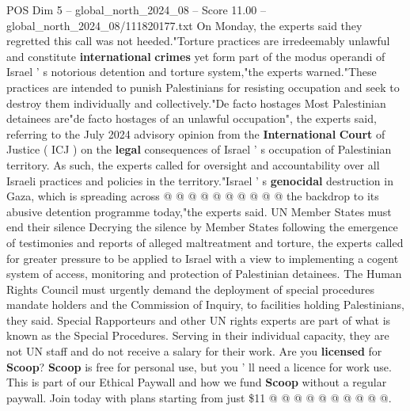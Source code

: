 \begin{textsample}{POS Dim 5 – global\_north\_2024\_08 – Score 11.00 – global\_north\_2024\_08/111820177.txt}
On Monday, the experts said they regretted this call was not heeded."Torture practices are irredeemably unlawful and constitute \textbf{international} \textbf{crimes} yet form part of the modus operandi of Israel ' s notorious detention and torture system,"the experts warned."These practices are intended to punish Palestinians for resisting occupation and seek to destroy them individually and collectively."De facto hostages Most Palestinian detainees are"de facto hostages of an unlawful occupation", the experts said, referring to the July 2024 advisory opinion from the \textbf{International} \textbf{Court} of Justice ( ICJ ) on the \textbf{legal} consequences of Israel ' s occupation of Palestinian territory.
As such, the experts called for oversight and accountability over all Israeli practices and policies in the territory."Israel ' s \textbf{genocidal} destruction in Gaza, which is spreading across @ @ @ @ @ @ @ @ @ @ the backdrop to its abusive detention programme today,"the experts said.
UN Member States must end their silence Decrying the silence by Member States following the emergence of testimonies and reports of alleged maltreatment and torture, the experts called for greater pressure to be applied to Israel with a view to implementing a cogent system of access, monitoring and protection of Palestinian detainees.
The Human Rights Council must urgently demand the deployment of special procedures mandate holders and the Commission of Inquiry, to facilities holding Palestinians, they said.
Special Rapporteurs and other UN rights experts are part of what is known as the Special Procedures.
Serving in their individual capacity, they are not UN staff and do not receive a salary for their work.
Are you \textbf{licensed} for \textbf{Scoop}? \textbf{Scoop} is free for personal use, but you ' ll need a licence for work use.
This is part of our Ethical Paywall and how we fund \textbf{Scoop} without a regular paywall.
Join today with plans starting from just \$11 @ @ @ @ @ @ @ @ @ @.

\end{textsample}
